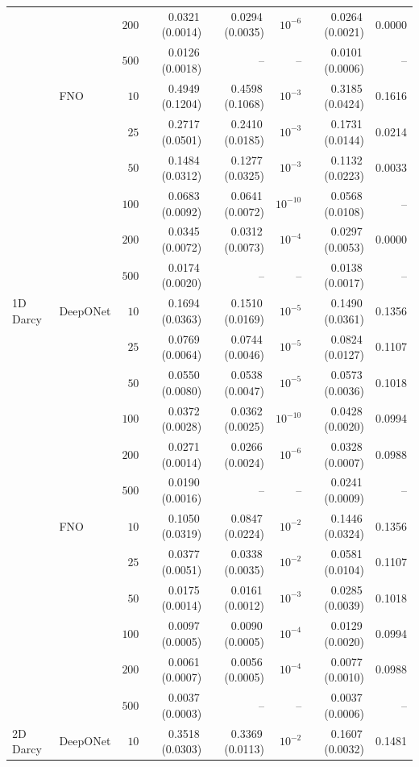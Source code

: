 \documentclass{article}
\begin{document}
{\begin{longtable}{llrrrrrr}
 &  & $200$ & 0.0321\,(0.0014) & 0.0294\,(0.0035) & $10^{-6}$ & 0.0264\,(0.0021) & 0.0000\\
 &  & $500$ & 0.0126\,(0.0018) & -- & -- & 0.0101\,(0.0006) & --\\
 & FNO & $10$ & 0.4949\,(0.1204) & 0.4598\,(0.1068) & $10^{-3}$ & 0.3185\,(0.0424) & 0.1616\\
 &  & $25$ & 0.2717\,(0.0501) & 0.2410\,(0.0185) & $10^{-3}$ & 0.1731\,(0.0144) & 0.0214\\
 &  & $50$ & 0.1484\,(0.0312) & 0.1277\,(0.0325) & $10^{-3}$ & 0.1132\,(0.0223) & 0.0033\\
 &  & $100$ & 0.0683\,(0.0092) & 0.0641\,(0.0072) & $10^{-10}$ & 0.0568\,(0.0108) & --\\
 &  & $200$ & 0.0345\,(0.0072) & 0.0312\,(0.0073) & $10^{-4}$ & 0.0297\,(0.0053) & 0.0000\\
 &  & $500$ & 0.0174\,(0.0020) & -- & -- & 0.0138\,(0.0017) & --\\
1D Darcy & DeepONet & $10$ & 0.1694\,(0.0363) & 0.1510\,(0.0169) & $10^{-5}$ & 0.1490\,(0.0361) & 0.1356\\
 &  & $25$ & 0.0769\,(0.0064) & 0.0744\,(0.0046) & $10^{-5}$ & 0.0824\,(0.0127) & 0.1107\\
 &  & $50$ & 0.0550\,(0.0080) & 0.0538\,(0.0047) & $10^{-5}$ & 0.0573\,(0.0036) & 0.1018\\
 &  & $100$ & 0.0372\,(0.0028) & 0.0362\,(0.0025) & $10^{-10}$ & 0.0428\,(0.0020) & 0.0994\\
 &  & $200$ & 0.0271\,(0.0014) & 0.0266\,(0.0024) & $10^{-6}$ & 0.0328\,(0.0007) & 0.0988\\
 &  & $500$ & 0.0190\,(0.0016) & -- & -- & 0.0241\,(0.0009) & --\\
 & FNO & $10$ & 0.1050\,(0.0319) & 0.0847\,(0.0224) & $10^{-2}$ & 0.1446\,(0.0324) & 0.1356\\
 &  & $25$ & 0.0377\,(0.0051) & 0.0338\,(0.0035) & $10^{-2}$ & 0.0581\,(0.0104) & 0.1107\\
 &  & $50$ & 0.0175\,(0.0014) & 0.0161\,(0.0012) & $10^{-3}$ & 0.0285\,(0.0039) & 0.1018\\
 &  & $100$ & 0.0097\,(0.0005) & 0.0090\,(0.0005) & $10^{-4}$ & 0.0129\,(0.0020) & 0.0994\\
 &  & $200$ & 0.0061\,(0.0007) & 0.0056\,(0.0005) & $10^{-4}$ & 0.0077\,(0.0010) & 0.0988\\
 &  & $500$ & 0.0037\,(0.0003) & -- & -- & 0.0037\,(0.0006) & --\\
2D Darcy & DeepONet & $10$ & 0.3518\,(0.0303) & 0.3369\,(0.0113) & $10^{-2}$ & 0.1607\,(0.0032) & 0.1481\\

\end{longtable}}
\end{document}
